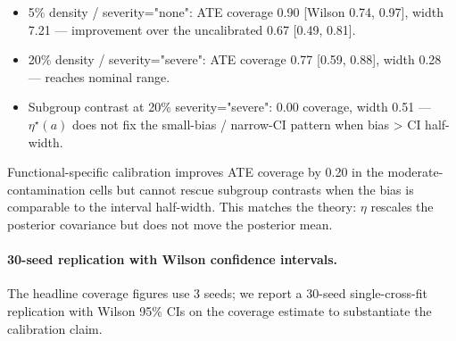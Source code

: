 \begin{itemize}\itemsep0pt
\item 5\% density / severity="none": ATE coverage 0.90 [Wilson 0.74, 0.97],
width 7.21 --- improvement over the uncalibrated 0.67 [0.49, 0.81].
\item 20\% density / severity="severe": ATE coverage 0.77 [0.59, 0.88],
width 0.28 --- reaches nominal range.
\item Subgroup contrast at 20\% severity="severe": 0.00 coverage,
width 0.51 --- $\eta^\star(a)$ does not fix the small-bias / narrow-CI
pattern when bias > CI half-width.
\end{itemize}

Functional-specific calibration improves ATE coverage by 0.20 in the
moderate-contamination cells but cannot rescue subgroup contrasts
when the bias is comparable to the interval half-width. This
matches the theory: $\eta$ rescales the posterior covariance but
does not move the posterior mean.

\paragraph{30-seed replication with Wilson confidence intervals.}
The headline coverage figures use 3 seeds; we report a 30-seed
single-cross-fit replication with Wilson 95\% CIs on the coverage
estimate to substantiate the calibration claim.

